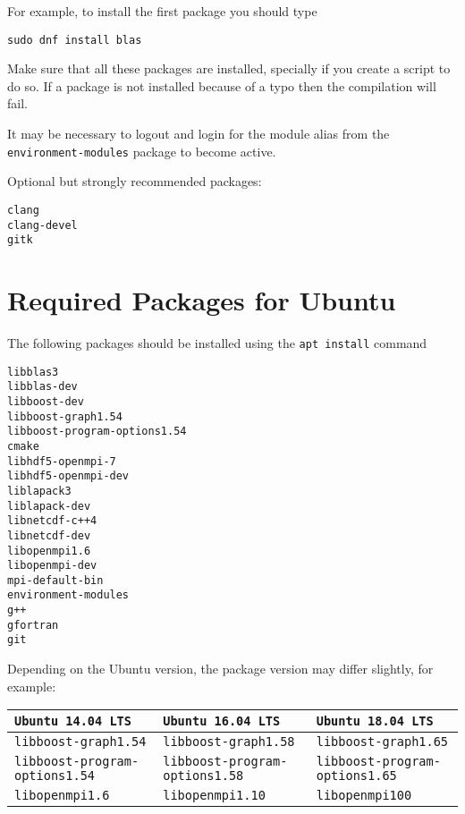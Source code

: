 \documentclass{article}
\begin{document}
For example, to install the first package you should type
\begin{verbatim}
sudo dnf install blas
\end{verbatim}

Make sure that all these packages are installed, specially if you
create a script to do so. If a package is not installed because of a
typo then the compilation will fail.

It may be necessary to logout and login for the module alias from the
\verb+environment-modules+ package to become active.

Optional but strongly recommended packages:
\begin{verbatim}
clang
clang-devel
gitk
\end{verbatim}

\section{Required Packages for Ubuntu}
The following packages should be installed using the \verb+apt install+
command
\begin{verbatim}
libblas3
libblas-dev
libboost-dev
libboost-graph1.54
libboost-program-options1.54
cmake
libhdf5-openmpi-7
libhdf5-openmpi-dev
liblapack3
liblapack-dev
libnetcdf-c++4
libnetcdf-dev
libopenmpi1.6
libopenmpi-dev
mpi-default-bin
environment-modules
g++
gfortran
git
\end{verbatim}

Depending on the Ubuntu version, the package version may differ slightly, for
example:

\begin{table}[H]
  \begin{center}
    \begin{tabular}{l l l}
      \toprule
      \verb+Ubuntu 14.04 LTS+ &
      \verb+Ubuntu 16.04 LTS+ &
      \verb+Ubuntu 18.04 LTS+ \\
      \midrule
      \verb+libboost-graph1.54+ &
      \verb+libboost-graph1.58+ &
      \verb+libboost-graph1.65+ \\
      \verb+libboost-program-options1.54+ &
      \verb+libboost-program-options1.58+ &
      \verb+libboost-program-options1.65+ \\
      \verb+libopenmpi1.6+ &
      \verb+libopenmpi1.10+ &
      \verb+libopenmpi100+ \\
      \bottomrule
    \end{tabular}
  \end{center}
\end{table}
\end{document}
